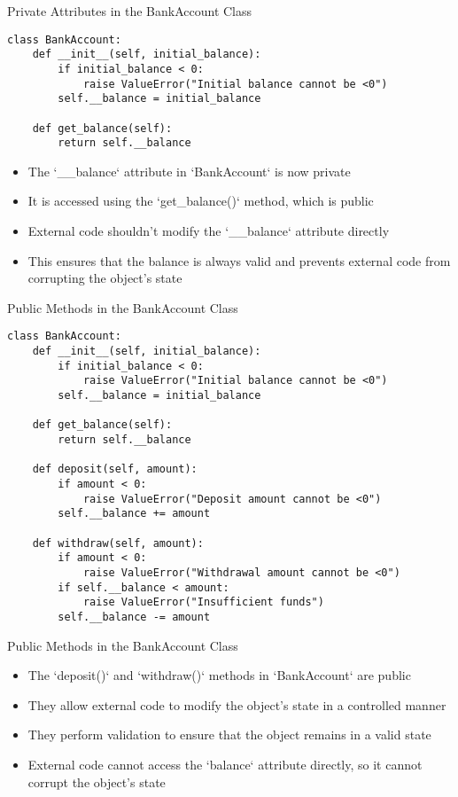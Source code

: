\documentclass[handout]{beamer}
\begin{document}
\begin{frame}[fragile]{Private Attributes in the BankAccount Class}
  \begin{lstlisting}[style=python]
class BankAccount:
    def __init__(self, initial_balance):
        if initial_balance < 0:
            raise ValueError("Initial balance cannot be <0")
        self.__balance = initial_balance

    def get_balance(self):
        return self.__balance
  \end{lstlisting}
  \begin{itemize}
    \item The `\_\_balance` attribute in `BankAccount` is now private
    \item It is accessed using the `get\_balance()` method, which is public
    \item External code shouldn't modify the `\_\_balance` attribute directly
    \item This ensures that the balance is always valid and prevents external code from corrupting the object's state
  \end{itemize}
\end{frame}

\begin{frame}[fragile]{Public Methods in the BankAccount Class}
  \begin{lstlisting}[style=python]
class BankAccount:
    def __init__(self, initial_balance):
        if initial_balance < 0:
            raise ValueError("Initial balance cannot be <0")
        self.__balance = initial_balance

    def get_balance(self):
        return self.__balance
        
    def deposit(self, amount):
        if amount < 0:
            raise ValueError("Deposit amount cannot be <0")
        self.__balance += amount

    def withdraw(self, amount):
        if amount < 0:
            raise ValueError("Withdrawal amount cannot be <0")
        if self.__balance < amount:
            raise ValueError("Insufficient funds")
        self.__balance -= amount
  \end{lstlisting}
\end{frame}

\begin{frame}[fragile]{Public Methods in the BankAccount Class}
  \begin{itemize}
    \item The `deposit()` and `withdraw()` methods in `BankAccount` are public
    \item They allow external code to modify the object's state in a controlled manner
    \item They perform validation to ensure that the object remains in a valid state
    \item External code cannot access the `balance` attribute directly, so it cannot corrupt the object's state
  \end{itemize}
\end{frame}
\end{document}
